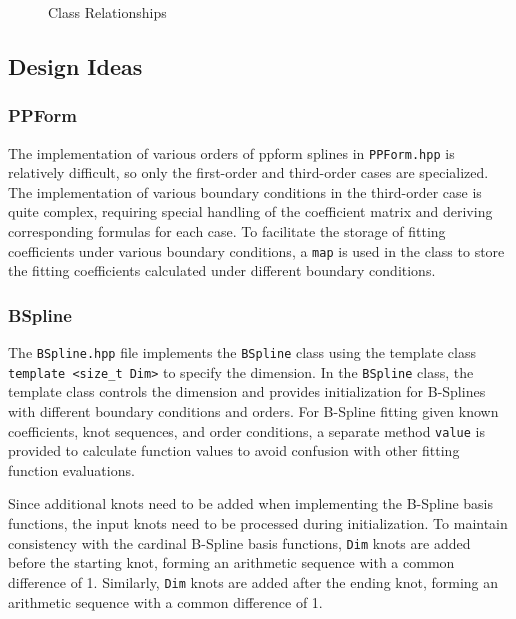\documentclass[a4paper]{article}
\begin{document}
\begin{sloppypar}
\begin{figure}[H]
  \renewcommand{\figurename}{Fig.}
  \caption{Class Relationships}
  \label{fig:class_relationships}
\end{figure}

\subsection{Design Ideas}
\subsubsection{PPForm}
The implementation of various orders of ppform splines in \verb|PPForm.hpp| is
relatively difficult, so only the first-order and third-order cases are
specialized. The implementation of various boundary conditions in the
third-order case is quite complex, requiring special handling of the
coefficient matrix and deriving corresponding formulas for each case. To
facilitate the storage of fitting coefficients under various boundary
conditions, a \verb|map| is used in the class to store the fitting coefficients
calculated under different boundary conditions.


\subsubsection{BSpline}
The \verb|BSpline.hpp| file implements the \verb|BSpline| class using the
template class \verb|template <size_t Dim>| to specify the dimension. In the
\verb|BSpline| class, the template class controls the dimension and provides
initialization for B-Splines with different boundary conditions and orders. For
B-Spline fitting given known coefficients, knot sequences, and order
conditions, a separate method \verb|value| is provided to calculate function
values to avoid confusion with other fitting function evaluations.

Since additional knots need to be added when implementing the B-Spline basis
functions, the input knots need to be processed during initialization. To
maintain consistency with the cardinal B-Spline basis functions, \verb|Dim|
knots are added before the starting knot, forming an arithmetic sequence with a
common difference of 1. Similarly, \verb|Dim| knots are added after the ending
knot, forming an arithmetic sequence with a common difference of 1.


\end{sloppypar}
\end{document}
